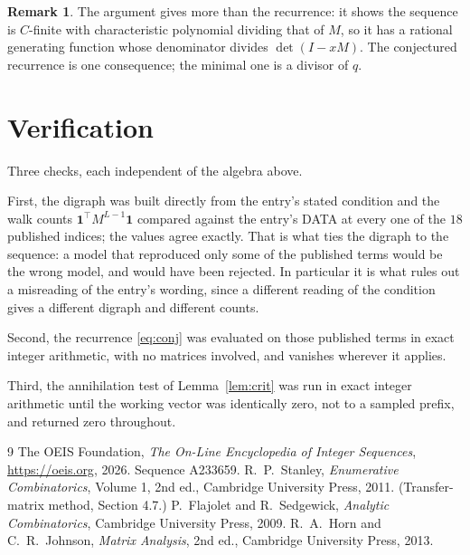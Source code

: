 \documentclass[11pt,a4paper]{article}
\theoremstyle{plain}
\theoremstyle{definition}
\newtheorem{remark}[theorem]{Remark}
\begin{document}
\begin{remark}
The argument gives more than the recurrence: it shows the sequence is $C$-finite with
characteristic polynomial dividing that of $M$, so it has a rational generating function
whose denominator divides $\det(I-xM)$. The conjectured recurrence is one consequence; the
minimal one is a divisor of $q$.
\end{remark}

\section{Verification}

Three checks, each independent of the algebra above.

First, the digraph was built directly from the entry's stated condition and the walk counts
$\mathbf{1}^{\!\top}M^{L-1}\mathbf{1}$ compared against the entry's DATA at
every one of the $18$ published indices; the values agree exactly. That is what ties
the digraph to the sequence: a model that reproduced only some of the published terms would
be the wrong model, and would have been rejected. In particular it is what rules out a
misreading of the entry's wording, since a different reading of the condition gives a
different digraph and different counts.

Second, the recurrence \eqref{eq:conj} was evaluated on those published terms in exact
integer arithmetic, with no matrices involved, and vanishes wherever it applies.

Third, the annihilation test of Lemma~\ref{lem:crit} was run in exact integer arithmetic
until the working vector was identically zero, not to a sampled prefix, and returned zero
throughout.

\begin{thebibliography}{9}
 The OEIS Foundation, \emph{The On-Line Encyclopedia of Integer
Sequences}, \url{https://oeis.org}, 2026. Sequence A233659.
 R.~P.~Stanley, \emph{Enumerative Combinatorics}, Volume 1, 2nd ed.,
Cambridge University Press, 2011. (Transfer-matrix method, Section 4.7.)
 P.~Flajolet and R.~Sedgewick, \emph{Analytic Combinatorics}, Cambridge
University Press, 2009.
 R.~A.~Horn and C.~R.~Johnson, \emph{Matrix Analysis}, 2nd ed., Cambridge
University Press, 2013.
\end{thebibliography}
\end{document}
